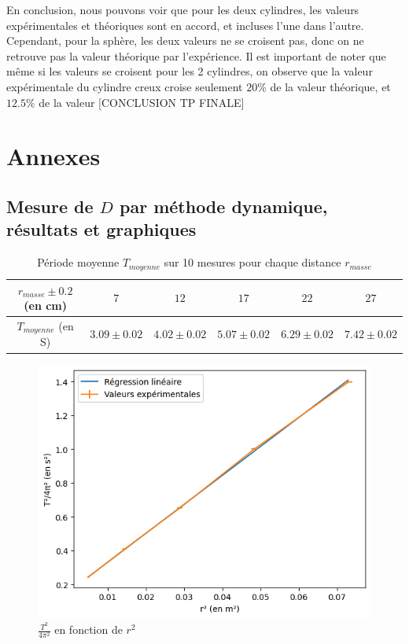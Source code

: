 \documentclass[12pt]{article}
\begin{document}
En conclusion, nous pouvons voir que pour les deux cylindres, les valeurs expérimentales et théoriques sont en accord, et incluses l'une dans l'autre. Cependant, pour la sphère, les deux valeurs
ne se croisent pas, donc on ne retrouve pas la valeur théorique par l'expérience. Il est important de noter que même si les valeurs se croisent pour les 2 cylindres, on observe
que la valeur expérimentale du cylindre creux croise seulement $20\%$ de la valeur théorique, et $12.5\%$ de la valeur 
[CONCLUSION TP FINALE]

\break
\section{Annexes}
\subsection{Mesure de $D$ par méthode dynamique, résultats et graphiques}
\label{section:D_dynamique}
\begin{table}[h!]
	\centering
	\begin{tabular}{||c | c c c c c||} 
		\hline
		$r_{masse} \pm 0.2$ (en cm) & $7$ & $12$ & $17$ & $22$ & $27$ \\
		\hline
        $T_{moyenne}$ (en S) & $3.09 \pm 0.02$ & $4.02 \pm 0.02$ & $5.07 \pm 0.02$ & $6.29 \pm 0.02$ & $7.42 \pm 0.02$\\
        \hline
    \end{tabular}
	\caption{Période moyenne $T_{moyenne}$ sur 10 mesures pour chaque distance $r_{masse}$}
	\label{table:mesure_D_dynamique}
\end{table}
\begin{figure}[h!]
    \begin{center}
        \includegraphics*[scale=1]{img/D_dynamique.png}
    \end{center}
    \caption{$\frac{T^2}{4\pi^2}$ en fonction de $r^2$}
    \label{fig:graphe_T}
\end{figure}
\end{document}
